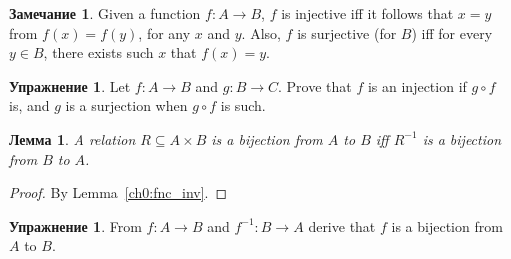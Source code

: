 \documentclass[12pt,notitlepage]{article}
\theoremstyle{plain}
\newtheorem{lemma}[thm]{Лемма}
\theoremstyle{definition}
\newtheorem{exc}[thm]{Упражнение}
\newtheorem{rem}[thm]{Замечание}
\theoremstyle{plain}
\newcommand{\sbs}{\subseteq}
\newcommand{\1}{\mathbf{1}}
\newcommand{\0}{\mathbf{0}}
\newcommand{\mcomm}[1]{}
\begin{document}
\begin{rem}
	Given a function $f\colon A \to B$, $f$ is injective iff it follows that $x = y$ from $f(x) = f(y)$, for any $x$ and $y$. Also, $f$ is surjective (for $B$) iff for every $y \in B$, there exists such $x$ that $f(x) = y$.
\end{rem}
\mcomm{This point may be not that obvious for some students. It makes sense to give a detailed proof.}

\begin{exc}
	Let $f\colon A \to B$ and $g\colon B \to C$. Prove that $f$ is an injection if $g\circ f$ is, and $g$ is a surjection when $g \circ f$ is such.
\end{exc}

\begin{lemma}\label{ch0:bi_inv}
	A relation $R \sbs A \times B$ is a bijection from $A$ to $B$ iff $R^{-1}$ is a bijection from $B$ to $A$.
\end{lemma}
\begin{proof} By Lemma~\ref{ch0:fnc_inv}.
\end{proof}

\begin{exc}
	From $f\colon A \to B$ and $f^{-1}\colon B \to A$ derive that $f$ is a bijection from $A$ to $B$.
\end{exc}
\end{document}

